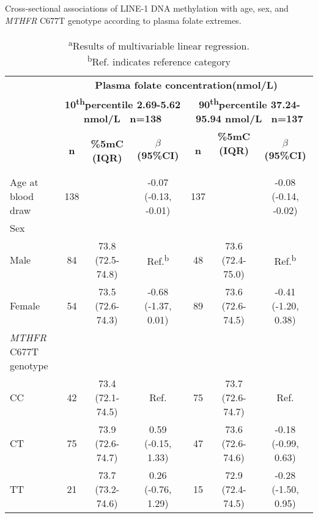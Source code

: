\begin{flushleft}
\begin{table}
\caption{Cross-sectional associations of LINE-1 DNA methylation with age, sex, and \emph{MTHFR} C677T genotype according to plasma folate extremes.}\label{table3_2}
\begin{adjustbox}{width=\textwidth}
\renewcommand{\arraystretch}{1.3}
\begin{tabular}{lcccccc}
\hline 
~ &\multicolumn{6}{c}{\centering \textbf{Plasma folate concentration(nmol/L)}}\\
\bfseries
&\multicolumn{3}{c}{\parbox[t]{3cm}{\centering \textbf{ 10\textsuperscript{th}percentile 2.69-5.62 nmol/L \ n=138\\}}} 
&\multicolumn{3}{c}{\parbox[t]{3cm}{\centering \textbf{ 90\textsuperscript{th}percentile 37.24-95.94 nmol/L \ n=137\\}}}\\
~ & \textbf{n} & \textbf{\%5mC (IQR)} & \textbf{$\beta$ (95\%CI)} & \textbf{n} & \textbf{ \%5mC (IQR)} ~ & \textbf{$\beta$ (95\%CI)}\\
\hline
Age at blood draw & 138 &~ & {}-0.07 (-0.13, -0.01) & 137 &~ & {}-0.08 (-0.14, -0.02)\\
Sex &~ &~ &~ &~ &~ &~\\ \quad Male & 84 & 73.8 (72.5-74.8) & Ref.\textsuperscript{b} & 48 & 73.6 (72.4-75.0) & Ref.\textsuperscript{b}\\ \quad Female & 54 & 73.5 (72.6-74.3) & {}-0.68 (-1.37, 0.01) & 89 & 73.6 (72.6-74.5) & {}-0.41 (-1.20, 0.38)\\
{\textit{MTHFR}}{ C677T genotype}&~ &~ &~ &~ &~ &~\\ \quad CC & 42 & 73.4 (72.1-74.5) & Ref. & 75 & 73.7 (72.6-74.7) & Ref.\\ \quad CT & 75 & 73.9 (72.6-74.7) & 0.59 (-0.15, 1.33) & 47 & 73.6 (72.6-74.6) & {}-0.18 (-0.99, 0.63)\\ \quad TT & 21 & 73.7 (73.2-74.6) & 0.26 (-0.76, 1.29) & 15 & 72.9 (72.4-74.5) & {}-0.28 (-1.50, 0.95)\\
\hline 
\end{tabular}
\end{adjustbox}
\caption*{\footnotesize{\textsuperscript{a}Results of multivariable linear regression.\\ \textsuperscript{b}Ref. indicates reference	category}}
\end{table}
\end{flushleft}




